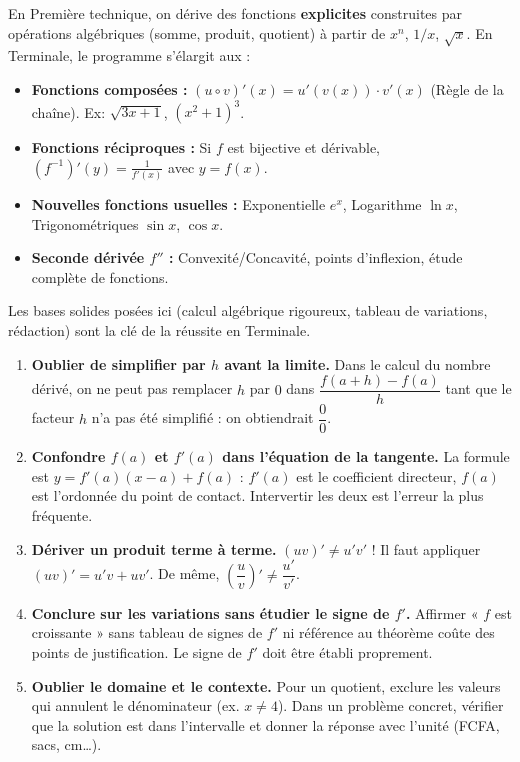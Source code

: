 \documentclass[11pt]{article}
\begin{document}
\begin{savaistu}
En Première technique, on dérive des fonctions \textbf{explicites} construites par opérations algébriques (somme, produit, quotient) à partir de $x^n$, $1/x$, $\sqrt{x}$.
En Terminale, le programme s'élargit aux :
\begin{itemize}
\item \textbf{Fonctions composées :} $(u \circ v)'(x) = u'(v(x)) \cdot v'(x)$ (Règle de la chaîne). Ex: $\sqrt{3x+1}$, $(x^2+1)^3$.
\item \textbf{Fonctions réciproques :} Si $f$ est bijective et dérivable, $(f^{-1})'(y) = \frac{1}{f'(x)}$ avec $y=f(x)$.
\item \textbf{Nouvelles fonctions usuelles :} Exponentielle $e^x$, Logarithme $\ln x$, Trigonométriques $\sin x$, $\cos x$.
\item \textbf{Seconde dérivée $f''$ :} Convexité/Concavité, points d'inflexion, étude complète de fonctions.
\end{itemize}
Les bases solides posées ici (calcul algébrique rigoureux, tableau de variations, rédaction) sont la clé de la réussite en Terminale.
\end{savaistu}

\begin{attention}
\begin{enumerate}
\item \textbf{Oublier de simplifier par $h$ avant la limite.} Dans le calcul du nombre dérivé, on ne peut pas remplacer $h$ par $0$ dans $\dfrac{f(a+h)-f(a)}{h}$ tant que le facteur $h$ n'a pas été simplifié : on obtiendrait $\dfrac{0}{0}$.
\item \textbf{Confondre $f(a)$ et $f'(a)$ dans l'équation de la tangente.} La formule est $y=f'(a)(x-a)+f(a)$ : $f'(a)$ est le coefficient directeur, $f(a)$ est l'ordonnée du point de contact. Intervertir les deux est l'erreur la plus fréquente.
\item \textbf{Dériver un produit terme à terme.} $(uv)'\neq u'v'$ ! Il faut appliquer $(uv)'=u'v+uv'$. De même, $\left(\dfrac{u}{v}\right)'\neq\dfrac{u'}{v'}$.
\item \textbf{Conclure sur les variations sans étudier le signe de $f'$.} Affirmer « $f$ est croissante » sans tableau de signes de $f'$ ni référence au théorème coûte des points de justification. Le signe de $f'$ doit être établi proprement.
\item \textbf{Oublier le domaine et le contexte.} Pour un quotient, exclure les valeurs qui annulent le dénominateur (ex. $x\neq 4$). Dans un problème concret, vérifier que la solution est dans l'intervalle et donner la réponse avec l'unité (FCFA, sacs, cm\ldots).
\end{enumerate}
\end{attention}
\end{document}
